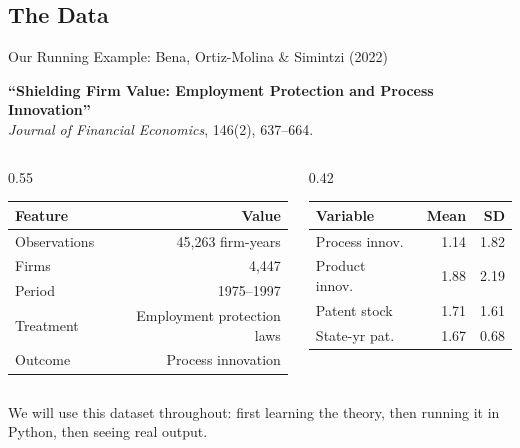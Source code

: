 \documentclass[9pt,aspectratio=169]{beamer}
\begin{document}
\subsection{The Data}
\begin{frame}{Our Running Example: Bena, Ortiz-Molina \& Simintzi (2022)}

\textbf{``Shielding Firm Value: Employment Protection and Process Innovation''}\\
\textit{Journal of Financial Economics}, 146(2), 637--664.

\medskip

\begin{columns}[T]
\begin{column}{0.55\textwidth}
\begin{tabular}{@{}lr@{}}
\toprule
\textbf{Feature} & \textbf{Value} \\
\midrule
Observations & 45,263 firm-years \\
Firms & 4,447 \\
Period & 1975--1997 \\
Treatment & Employment protection laws \\
Outcome & Process innovation \\
\bottomrule
\end{tabular}
\end{column}
\begin{column}{0.42\textwidth}
\begin{tabular}{@{}lrr@{}}
\toprule
\textbf{Variable} & \textbf{Mean} & \textbf{SD} \\
\midrule
Process innov.\ & 1.14 & 1.82 \\
Product innov.\ & 1.88 & 2.19 \\
Patent stock & 1.71 & 1.61 \\
State-yr pat.\ & 1.67 & 0.68 \\
\bottomrule
\end{tabular}
\end{column}
\end{columns}

\bigskip

\begin{highlightbox}
\centering
We will use this dataset throughout: first learning the theory, then running it in Python, then seeing real output.
\end{highlightbox}

\end{frame}


\end{document}
